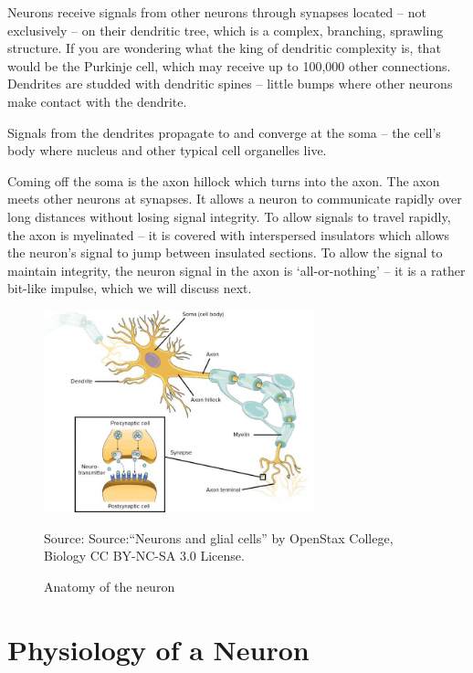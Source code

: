 \documentclass[12pt,a4paper]{report}
\begin{document}
Neurons receive signals from other neurons through synapses located – not exclusively – on their dendritic tree, which is a complex, branching, sprawling structure. If you are wondering what the king of dendritic complexity is, that would be the Purkinje cell, which may receive up to 100,000 other connections. Dendrites are studded with dendritic spines – little bumps where other neurons make contact with the dendrite.

\vspace{10pt}
Signals from the dendrites propagate to and converge at the soma – the cell’s body where nucleus and other typical cell organelles live.

\vspace{10pt}
Coming off the soma is the axon hillock which turns into the axon. The axon meets other neurons at synapses. It allows a neuron to communicate rapidly over long distances without losing signal integrity. To allow signals to travel rapidly, the axon is myelinated – it is covered with interspersed insulators which allows the neuron’s signal to jump between insulated sections. To allow the signal to maintain integrity, the neuron signal in the axon is ‘all-or-nothing’ – it is a rather bit-like impulse, which we will discuss next.


\begin{figure}[H]
    \centering
    \includegraphics[width=0.7\textwidth]{./data/neural.jpg}
    \caption{Anatomy of the neuron}
    \label{fig:my_picture}
    \vspace{1pt} %
    \small{Source: Source:“Neurons and glial cells” by OpenStax College, Biology CC BY-NC-SA 3.0 License.}
\end{figure}


\section{Physiology of a Neuron}
\end{document}
